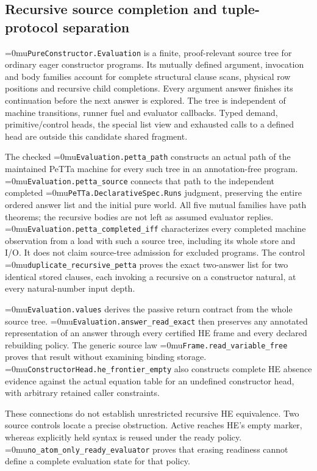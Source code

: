 \documentclass[11pt,a4paper]{article}
\newcommand{\code}[1]{\texttt{\detokenize{#1}}}
\newcommand{\name}[1]{\textup{\Urlmuskip=0mu\relax\nolinkurl{#1}}}
\begin{document}
\subsection*{Recursive source completion and tuple-protocol separation}

\name{PureConstructor.Evaluation} is a finite, proof-relevant source tree
for ordinary eager constructor programs. Its mutually defined argument,
invocation and body families account for complete structural clause scans,
physical row positions and recursive child completions. Every argument answer
finishes its continuation before the next answer is explored. The tree is
independent of machine transitions, runner fuel and evaluator callbacks.
Typed demand, primitive/control heads, the special \code{cons} list view and
exhausted calls to a defined head are outside this candidate shared fragment.

The checked \name{Evaluation.petta_path} constructs an actual path of the
maintained PeTTa machine for every such tree in an annotation-free program.
\name{Evaluation.petta_source} connects that path to the independent completed
\name{PeTTa.DeclarativeSpec.Runs} judgment, preserving the entire ordered
answer list and the initial pure world. All five mutual families have path
theorems; the recursive bodies are not left as assumed evaluator replies.
\name{Evaluation.petta_completed_iff} characterizes every completed machine
observation from a load with such a source tree, including its whole store
and I/O. It does not claim source-tree admission for excluded programs.
The control \name{duplicate_recursive_petta} proves the exact two-answer list
for two identical stored \code{fork} clauses, each invoking a recursive
\code{strip} on a constructor natural, at every natural-number input depth.

\name{Evaluation.values} derives the passive return contract from the whole
source tree. \name{Evaluation.answer_read_exact} then preserves any annotated
representation of an answer through every certified HE frame and every
declared rebuilding policy. The generic source law
\name{Frame.read_variable_free} proves that result without examining binding
storage. \name{ConstructorHead.he_frontier_empty} also constructs complete
HE absence evidence against the actual equation table for an undefined
constructor head, with arbitrary retained caller constraints.

These connections do not establish unrestricted recursive HE equivalence.
Two source controls locate a precise obstruction. Active \code{(Empty A)}
reaches HE's empty marker, whereas explicitly held syntax is reused under the
ready policy. \name{no_atom_only_ready_evaluator} proves that erasing readiness
cannot define a complete evaluation state for that policy.
\end{document}
